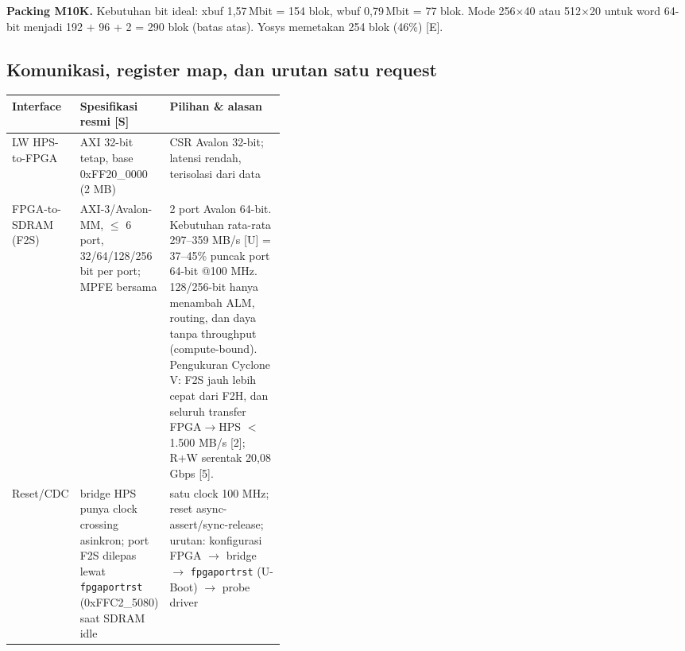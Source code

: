 \documentclass[9pt]{extarticle}
\newcommand{\hd}[1]{\cellcolor{thbg}\textbf{#1}}
\begin{document}
\textbf{Packing M10K.} Kebutuhan bit ideal: xbuf 1,57\,Mbit = 154 blok, wbuf 0,79\,Mbit = 77 blok. Mode 256$\times$40 atau 512$\times$20 untuk word 64-bit menjadi 192 + 96 + 2 = 290 blok (batas atas). Yosys memetakan 254 blok (46\%) [E].

\subsection{Komunikasi, register map, dan urutan satu request}
{\scriptsize
\begin{tabularx}{\linewidth}{|p{0.13\linewidth}|p{0.27\linewidth}|L|}
\hline
\hd{Interface} & \hd{Spesifikasi resmi [S]} & \hd{Pilihan \& alasan} \\ \hline
LW HPS-to-FPGA & AXI 32-bit tetap, base 0xFF20\_0000 (2 MB) & CSR Avalon 32-bit; latensi rendah, terisolasi dari data \\ \hline
FPGA-to-SDRAM (F2S) & AXI-3/Avalon-MM, $\le$ 6 port, 32/64/128/256 bit per port; MPFE bersama & 2 port Avalon 64-bit. Kebutuhan rata-rata 297--359 MB/s [U] = 37--45\% puncak port 64-bit @100 MHz. 128/256-bit hanya menambah ALM, routing, dan daya tanpa throughput (compute-bound). Pengukuran Cyclone V: F2S jauh lebih cepat dari F2H, dan seluruh transfer FPGA$\rightarrow$HPS $<$ 1.500 MB/s [2]; R+W serentak 20,08 Gbps [5]. \\ \hline
Reset/CDC & bridge HPS punya clock crossing asinkron; port F2S dilepas lewat \texttt{fpgaportrst} (0xFFC2\_5080) saat SDRAM idle & satu clock 100 MHz; reset async-assert/sync-release; urutan: konfigurasi FPGA $\rightarrow$ bridge $\rightarrow$ \texttt{fpgaportrst} (U-Boot) $\rightarrow$ probe driver \\ \hline
\end{tabularx}}
\end{document}
